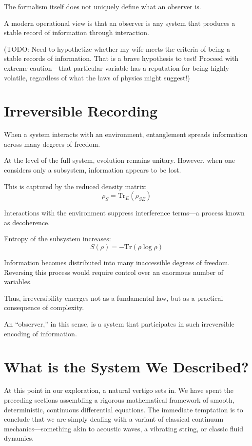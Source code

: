 The formalism itself does not uniquely define what an observer is.

A modern operational view is that an observer is any system that produces a stable record of information through interaction.

(TODO: Need to hypothetize whether my wife meets the criteria of being a stable records of information. 
That is a brave hypothesis to test! Proceed with extreme caution—that particular variable has a reputation for being highly volatile,
regardless of what the laws of physics might suggest!)


\section{Irreversible Recording}

When a system interacts with an environment, entanglement spreads information across many degrees of freedom.

At the level of the full system, evolution remains unitary. However, when one considers only a subsystem, information appears to be lost.

This is captured by the reduced density matrix:
\[
\rho_S = \mathrm{Tr}_E(\rho_{SE})
\]

Interactions with the environment suppress interference terms—a process known as decoherence.

Entropy of the subsystem increases:
\[
S(\rho) = -\mathrm{Tr}(\rho \log \rho)
\]

Information becomes distributed into many inaccessible degrees of freedom. Reversing this process would require control over an enormous number of variables.

Thus, irreversibility emerges not as a fundamental law, but as a practical consequence of complexity.

An “observer,” in this sense, is a system that participates in such irreversible encoding of information.


\section*{What is the System We Described?}

At this point in our exploration, a natural vertigo sets in. We have spent the preceding sections assembling a rigorous mathematical framework of smooth,
deterministic, continuous differential equations.
The immediate temptation is to conclude that we are simply dealing with a variant of classical continuum mechanics---something akin to acoustic waves, a vibrating string, or classic fluid dynamics.

